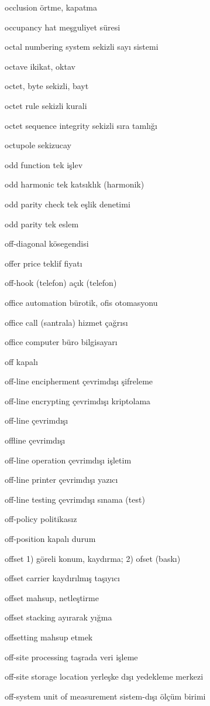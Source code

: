 \documentclass[12pt,fleqn]{article}\usepackage{../../common}
\begin{document}
occlusion örtme, kapatma

occupancy hat meşguliyet süresi

octal numbering system sekizli sayı sistemi

octave ikikat, oktav

octet, byte sekizli, bayt

octet rule sekizli kurali

octet sequence integrity sekizli sıra tamlığı

octupole sekizucay

odd function tek işlev

odd harmonic tek katsıklık (harmonik)

odd parity check tek eşlik denetimi

odd parity tek eslem

off-diagonal kösegendisi

offer price teklif fiyatı

off-hook (telefon) açık (telefon)

office automation bürotik, ofis otomasyonu

office call (santrala) hizmet çağrısı

office computer büro bilgisayarı

off kapalı

off-line encipherment çevrimdışı şifreleme

off-line encrypting çevrimdışı kriptolama

off-line çevrimdışı

offline çevrimdışı

off-line operation çevrimdışı işletim

off-line printer çevrimdışı yazıcı

off-line testing çevrimdışı sınama (test)

off-policy politikasız

off-position kapalı durum

offset 1) göreli konum, kaydırma; 2) ofset (baskı)

offset carrier kaydırılmış taşıyıcı

offset mahsup, netleştirme

offset stacking ayırarak yığma

offsetting mahsup etmek

off-site processing taşrada veri işleme

off-site storage location yerleşke dışı yedekleme merkezi

off-system unit of measurement sistem-dışı ölçüm birimi
\end{document}
